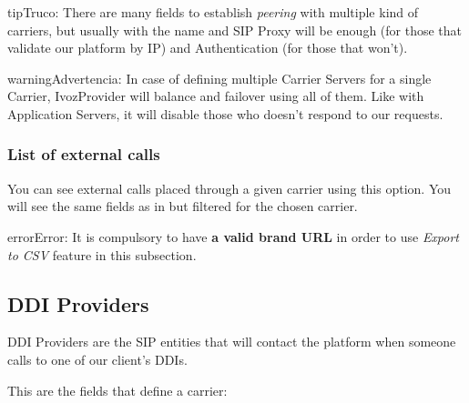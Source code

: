 \documentclass[letterpaper,10pt,spanish]{sphinxmanual}
\begin{document}
\begin{notice}{tip}{Truco:}
There are many fields to establish \emph{peering} with multiple kind of
carriers, but usually with the name and SIP Proxy will be enough (for
those that validate our platform by IP) and Authentication (for those that
won't).
\end{notice}

\begin{notice}{warning}{Advertencia:}
In case of defining multiple Carrier Servers for a single
Carrier, IvozProvider will balance and failover using all of them.
Like with Application Servers, it will disable those who doesn't respond to
our requests.
\end{notice}


\subsubsection{List of external calls}
\label{administration_portal/brand/providers/carriers:list-of-external-calls}
You can see external calls placed through a given carrier using this option. You will see the same fields as in
{\hyperref[administration_portal/platform/external_calls:external\string-calls]{}} but filtered for the chosen carrier.

\begin{notice}{error}{Error:}
It is compulsory to have \textbf{a valid brand URL} in order to use \emph{Export to CSV} feature in this subsection.
\end{notice}


\subsection{DDI Providers}
\label{administration_portal/brand/providers/ddi_providers:ddi-providers}\label{administration_portal/brand/providers/ddi_providers::doc}\label{administration_portal/brand/providers/ddi_providers:id1}
DDI Providers are the SIP entities that will contact the platform when someone calls to one of our client's DDIs.

This are the fields that define a carrier:
\end{document}
